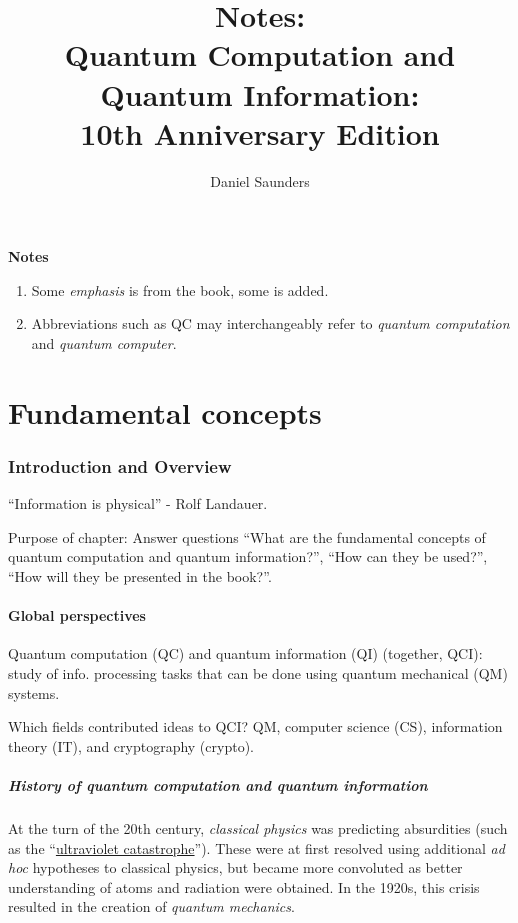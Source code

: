 \documentclass{article}
\title{Notes: \\Quantum Computation and Quantum Information: \\10th Anniversary Edition}
\author{Daniel Saunders}
\numberwithin{equation}{section}
\begin{document}
\maketitle

\textbf{Notes}

\begin{enumerate}
	\item Some \textit{emphasis} is from the book, some is added.
	\item Abbreviations such as QC may interchangeably refer to \textit{quantum computation} and \textit{quantum computer}.
\end{enumerate}

\part{Fundamental concepts}

\section{Introduction and Overview}

``Information is physical'' - Rolf Landauer.

Purpose of chapter: Answer questions ``What are the fundamental concepts of quantum computation and quantum information?'', ``How can they be used?'', ``How will they be presented in the book?''.

\subsection{Global perspectives}

Quantum computation (QC) and quantum information (QI) (together, QCI): study of info. processing tasks that can be done using quantum mechanical (QM) systems.

Which fields contributed ideas to QCI? QM, computer science (CS), information theory (IT), and cryptography (crypto).

\subsubsection{History of quantum computation and quantum information}

At the turn of the 20th century, \textit{classical physics} was predicting absurdities (such as the ``\href{https://en.wikipedia.org/wiki/Ultraviolet_catastrophe}{ultraviolet catastrophe}''). These were at first resolved using additional \textit{ad hoc} hypotheses to classical physics, but became more convoluted as better understanding of atoms and radiation were obtained. In the 1920s, this crisis resulted in the creation of \textit{quantum mechanics}.
\end{document}
